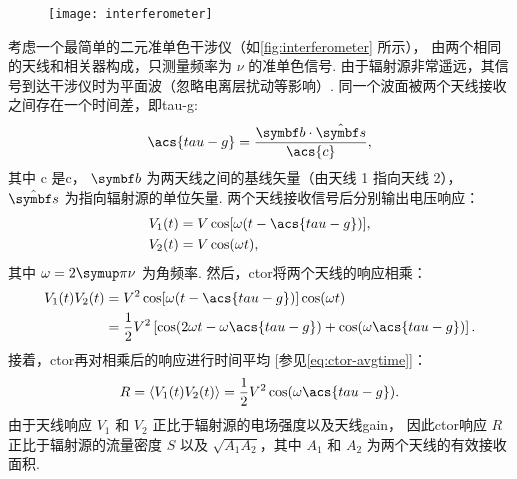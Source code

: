 \begin{figure}
  \centering
  \texttt{[image: interferometer]}
  \label{fig:interferometer}
\end{figure}

考虑一个最简单的二元准单色干涉仪（如\autoref{fig:interferometer} 所示），
由两个相同的天线和相关器构成，只测量频率为 $\nu$ 的准单色信号.
由于辐射源非常遥远，其信号到达干涉仪时为平面波（忽略电离层扰动等影响）.
同一个波面被两个天线接收之间存在一个时间差，即\ac{tau-g}:
\begin{equation}
  \label{eq:tau-g}
  \acs{tau-g} = \frac{\B{b} \cdot \hat{\B{s}}}{\acs{c}},
\end{equation}
其中 \acs{c} 是\acl{c}，
$\B{b}$ 为两天线之间的基线矢量（由天线 1 指向天线 2），
$\hat{\B{s}}$ 为指向辐射源的单位矢量.
两个天线接收信号后分别输出电压响应：
\begin{align}
  V_1(t) &= V \cos [\omega (t - \acs{tau-g})], \\
  V_2(t) &= V \cos (\omega t),
\end{align}
其中 $\omega = 2\Cpi\nu$ 为角频率.
然后，\ac{ctor}将两个天线的响应相乘：
\begin{align}
  V_1(t) V_2(t) &= V^2 \cos [\omega (t - \acs{tau-g})] \cos (\omega t) \\
    &= \frac{1}{2} V^2 \left[ \cos (2\omega t - \omega \acs{tau-g})
      + \cos (\omega \acs{tau-g}) \right].
\end{align}
接着，\acl{ctor}再对相乘后的响应进行时间平均 [参见\autoref{eq:ctor-avgtime}]：
\begin{equation}
  \label{eq:resp-corr}
  R = \langle V_1(t) V_2(t) \rangle
    = \frac{1}{2} V^2 \cos (\omega \acs{tau-g}).
\end{equation}
由于天线响应 $V_1$ 和 $V_2$ 正比于辐射源的电场强度以及天线\acl{gain}，
因此\acl{ctor}响应 $R$ 正比于辐射源的流量密度 $S$
以及 $\sqrt{A_1 A_2}$，其中 $A_1$ 和 $A_2$ 为两个天线的有效接收面积.

